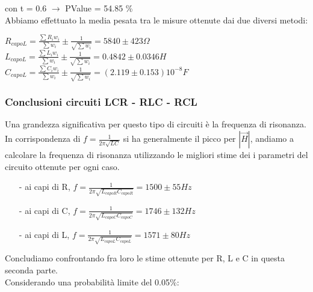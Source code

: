 \documentclass{article}
\theoremstyle{definition}
\begin{document}
con t = 0.6 \(\rightarrow\) PValue = 54.85 \%\\

\noindent Abbiamo effettuato la media pesata tra le misure ottenute dai due diversi metodi:


\(R_{capoL} = \frac{\sum R_{i}w_{i}}{\sum w_{i}} \pm \frac{1}{\sqrt{\sum w_{i}}} = 5840 \pm 423 \Omega\) \\


\(L_{capoL} = \frac{\sum L_{i}w_{i}}{\sum w_{i}} \pm \frac{1}{\sqrt{\sum w_{i}}}= 0.4842 \pm 0.0346 H\) \\

\(C_{capoL} = \frac{\sum C_{i}w_{i}}{\sum w_{i}} \pm \frac{1}{\sqrt{\sum w_{i}}}= (2.119 \pm 0.153) 10^{-8}  F\)\\

\pagebreak
\subsubsection{Conclusioni circuiti LCR - RLC - RCL}
Una grandezza significativa per questo tipo di circuiti è la frequenza di risonanza. In corrispondenza di \(f = \frac{1}{2\pi \sqrt{LC}}\) si ha generalmente il picco per \(\left| \vec{H}\right|\), andiamo a calcolare la frequenza di risonanza utilizzando le migliori stime dei i parametri del circuito ottenute per ogni caso. \\
\begin{enumerate}
    \item[-] ai capi di R, \(f = \frac{1}{2\pi \sqrt{L_{capoR} C_{capoR}}} = 1500  \pm 55 Hz\)
    
    \item[-] ai capi di C, \(f = \frac{1}{2\pi \sqrt{L_{capoC} C_{capoC}}} = 1746  \pm 132 Hz\)
    
    \item[-] ai capi di L, \(f = \frac{1}{2\pi \sqrt{L_{capoL} C_{capoL}}} = 1571 \pm 80 Hz\)
\end{enumerate}

\noindent Concludiamo confrontando fra loro le stime ottenute per R, L e C in questa seconda parte. \\

\noindent Considerando una probabilità limite del 0.05\%: 
\end{document}
